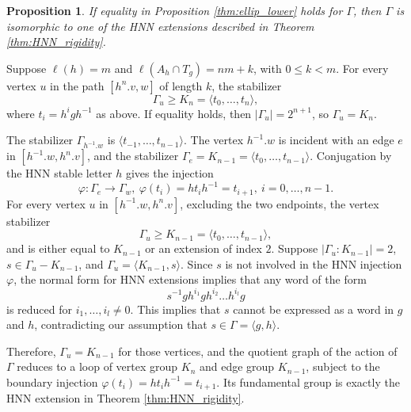 \documentclass[12pt,leqno]{amsart}
\makeatletter
\renewenvironment{proof}[1][\proofname]{%
	\par
	\pushQED{\qed}%
	\normalfont
	\topsep6\p@\@plus6\p@\relax
	\trivlist
	\item[\hskip\labelsep\itshape #1\@addpunct{.}]%
	\ignorespaces
}{%
	\par\nobreak\vspace{2pt}%
	\popQED%
	\medskip%
	\endtrivlist
	\@endpefalse
}
\newcommand{\2}{L^2_{\rm per}(0, T)}
\newtheorem{prop}{Proposition}[section]
\numberwithin{equation}{section}
\numberwithin{figure}{section}
\makeatother
\begin{document}
\begin{prop}
    If equality in Proposition \ref{thm:ellip_lower} holds for $\Gamma$, then $\Gamma$ is isomorphic to one of the HNN extensions described in Theorem \ref{thm:HNN_rigidity}.
\end{prop}
\begin{proof}
    Suppose $\ell(h) = m$ and $\ell(A_h\cap T_g) = nm+k$, with $0\leq k<m$. For every vertex $u$ in the path $[h^n.v,w]$ of length $k$, the stabilizer
    \[
    \Gamma_u\geq K_n = \langle t_0,\dots, t_n\rangle,
    \]
    where $t_i = h^igh^{-1}$ as above. If equality holds, then $\lvert \Gamma_u\rvert = 2^{n+1}$, so $\Gamma_u = K_n$.
    
    The stabilizer $\Gamma_{h^{-1}.w}$ is $\langle t_{-1},\dots, t_{n-1}\rangle$. The vertex $h^{-1}.w$ is incident with an edge $e$ in $[h^{-1}.w,h^n.v]$, and the stabilizer $\Gamma_e = K_{n-1} = \langle t_{0},\dots, t_{n-1}\rangle$. Conjugation by the HNN stable letter $h$ gives the injection
    \[
    \varphi: \Gamma_e\to \Gamma_w,\ \varphi(t_i) = ht_ih^{-1} = t_{i+1}, \ i=0,\dots, n-1.
    \]
    For every vertex $u$ in $[h^{-1}.w,h^n.v]$, excluding the two endpoints, the vertex stabilizer
    \[
    \Gamma_u\geq K_{n-1} = \langle t_0,\dots, t_{n-1}\rangle,
    \]
    and is either equal to $K_{n-1}$ or an extension of index $2$. Suppose $\lvert \Gamma_u: K_{n-1}\rvert = 2$, $s\in \Gamma_u - K_{n-1}$, and $\Gamma_u = \langle K_{n-1},s\rangle$. Since $s$ is not involved in the HNN injection $\varphi$, the normal form for HNN extensions implies that any word of the form
    \[
    s^{-1}gh^{i_1}gh^{i_2}\dots h^{i_l}g
    \]
    is reduced for $i_1,\dots, i_l\neq 0$. This implies that $s$ cannot be expressed as a word in $g$ and $h$, contradicting our assumption that $s\in \Gamma = \langle g,h\rangle$.

    Therefore, $\Gamma_u = K_{n-1}$ for those vertices, and the quotient graph of the action of $\Gamma$ reduces to a loop of vertex group $K_n$ and edge group $K_{n-1}$, subject to the boundary injection $\varphi(t_i) = ht_ih^{-1} = t_{i+1}$. Its fundamental group is exactly the HNN extension in Theorem \ref{thm:HNN_rigidity}.
\end{proof}
\end{document}
